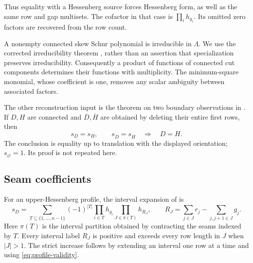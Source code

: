 \documentclass[11pt,a4paper]{amsart}
\numberwithin{equation}{section}
\theoremstyle{plain}
\theoremstyle{definition}
\begin{document}
Thus equality with a Hessenberg source forces Hessenberg form, as well
as the same row and gap multisets.  The cofactor in that case is
\(\prod_i h_{g_i}\).  Its omitted zero factors are recovered from the
row count.

A nonempty connected skew Schur polynomial is irreducible in \(\Lambda\).
We use the corrected irreducibility theorem
\cite{Barekat2009CoincidencesCorrigendum}, rather than an assertion that
specialization preserves irreducibility.  Consequently a product of
functions of connected cut components determines their functions with
multiplicity.  The minimum-square monomial, whose coefficient is one,
removes any scalar ambiguity between associated factors.

The other reconstruction input is the theorem on two boundary observations
in \cite{Shields2026SkewSchur}.  If \(D,H\) are connected and
\(\overline D,\overline H\) are obtained by deleting their entire first
rows, then
\begin{equation}\label{eq:boundary-reconstruction-input}
 s_D=s_H,\qquad s_{\overline D}=s_{\overline H}
 \quad\Longrightarrow\quad D=H.
\end{equation}
The conclusion is equality up to translation with the displayed orientation;
\(s_\varnothing=1\).  Its proof is not repeated here.

\subsection{Seam coefficients}\label{subsec:seam-coefficients}

For an upper-Hessenberg profile, the interval expansion of
\cite{Shields2026NegativeCount} is
\begin{equation}\label{eq:interval-expansion}
 s_D=\sum_{T\subseteq\{1,\ldots,n-1\}}
 (-1)^{|T|}\prod_{i\in T}h_{g_i}
 \prod_{J\in\pi(T)}h_{R_J},\qquad
 R_J=\sum_{j\in J}r_j-\sum_{j,j+1\in J}g_j.
\end{equation}
Here \(\pi(T)\) is the interval partition obtained by contracting the
seams indexed by \(T\).  Every interval label \(R_J\) is positive
and exceeds every row length in \(J\) when \(|J|>1\).  The strict
increase follows by extending an interval one row at a time and using
\eqref{eq:profile-validity}.
\end{document}
